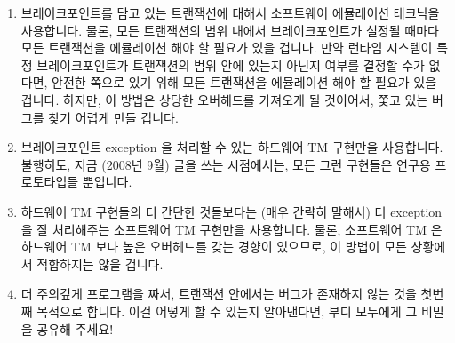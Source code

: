 \begin{enumerate}
\item	브레이크포인트를 담고 있는 트랜잭션에 대해서 소프트웨어 에뮬레이션
	테크닉을 사용합니다.
	물론, 모든 트랜잭션의 범위 내에서 브레이크포인트가 설정될 때마다 모든
	트랜잭션을 에뮬레이션 해야 할 필요가 있을 겁니다.
	만약 런타임 시스템이 특정 브레이크포인트가 트랜잭션의 범위 안에 있는지
	아닌지 여부를 결정할 수가 없다면, 안전한 쪽으로 있기 위해 모든
	트랜잭션을 에뮬레이션 해야 할 필요가 있을 겁니다.
	하지만, 이 방법은 상당한 오버헤드를 가져오게 될 것이어서, 쫓고 있는
	버그를 찾기 어렵게 만들 겁니다.

\item	브레이크포인트 exception 을 처리할 수 있는 하드웨어 TM 구현만을
	사용합니다.
	불행히도, 지금 (2008년 9월) 글을 쓰는 시점에서는, 모든 그런 구현들은
	연구용 프로토타입들 뿐입니다.
\item	하드웨어 TM 구현들의 더 간단한 것들보다는 (매우 간략히 말해서) 더
	exception 을 잘 처리해주는 소프트웨어 TM 구현만을 사용합니다.
	물론, 소프트웨어 TM 은 하드웨어 TM 보다 높은 오버헤드를 갖는 경향이
	있으므로, 이 방법이 모든 상황에서 적합하지는 않을 겁니다.
\item	더 주의깊게 프로그램을 짜서, 트랜잭션 안에서는 버그가 존재하지 않는
	것을 첫번째 목적으로 합니다.
	이걸 어떻게 할 수 있는지 알아낸다면, 부디 모두에게 그 비밀을 공유해
	주세요!

\end{enumerate}

